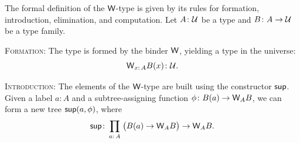 \begin{defn}
    The formal definition of the $\mathsf{W}$-type is given by its rules for formation, introduction, elimination, and computation. Let $A\colon\univ$ be a type and $B\colon A\to\univ$ be a type family.
    
    \textsc{Formation:} The type is formed by the binder $\mathsf{W}$, yielding a type in the universe:
    \[
        \fun W_{x\colon A}B(x)\colon\univ.
    \]
    
    \textsc{Introduction:} The elements of the $\mathsf{W}$-type are built using the constructor $\mathsf{sup}$. Given a label $a\colon A$ and a subtree-assigning function $\phi\colon B(a)\to \fun W_AB$, we can form a new tree $\mathsf{sup}(a,\phi)$, where
    \begin{equation}\label{eq:W-constructor}
        \fun{sup}\colon
            \prod_{a\colon A}\;
            \bigl(
                B(a)\to\fun W_AB
            \bigr)
            \to\fun W_AB.
    \end{equation}
    

\end{defn}
